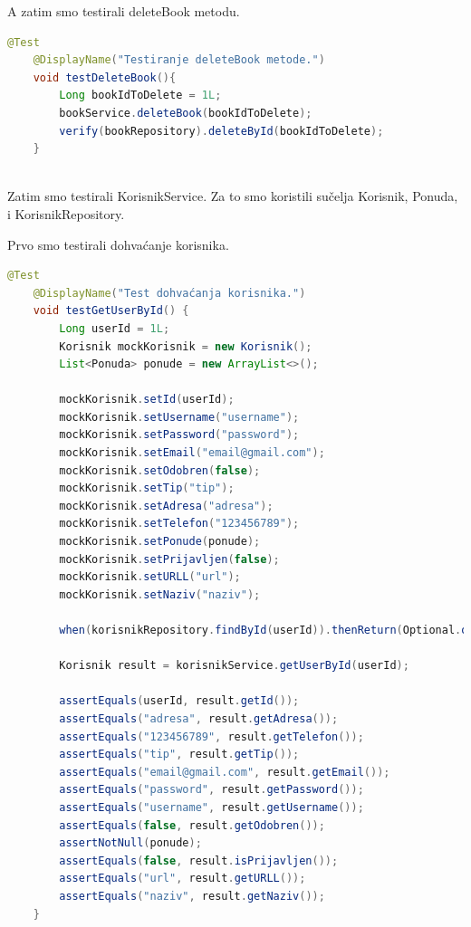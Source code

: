    
			A zatim smo testirali deleteBook metodu. 
                  \begin{lstlisting}[language=Java, label=2st:java_example, basicstyle=\scriptsize, baselinestretch=0.9]
 @Test
    @DisplayName("Testiranje deleteBook metode.")
    void testDeleteBook(){
        Long bookIdToDelete = 1L;
        bookService.deleteBook(bookIdToDelete);
        verify(bookRepository).deleteById(bookIdToDelete);
    }
    
\end{lstlisting}

            Zatim smo testirali KorisnikService. Za to smo koristili sučelja Korisnik, Ponuda, i KorisnikRepository.
            
			Prvo smo testirali dohvaćanje korisnika. 
                  \begin{lstlisting}[language=Java, label=3st:java_example, basicstyle=\scriptsize, baselinestretch=0.9]
 @Test
    @DisplayName("Test dohvaćanja korisnika.")
    void testGetUserById() {
        Long userId = 1L;
        Korisnik mockKorisnik = new Korisnik();
        List<Ponuda> ponude = new ArrayList<>();

        mockKorisnik.setId(userId);
        mockKorisnik.setUsername("username");
        mockKorisnik.setPassword("password");
        mockKorisnik.setEmail("email@gmail.com");
        mockKorisnik.setOdobren(false);
        mockKorisnik.setTip("tip");
        mockKorisnik.setAdresa("adresa");
        mockKorisnik.setTelefon("123456789");
        mockKorisnik.setPonude(ponude);
        mockKorisnik.setPrijavljen(false);
        mockKorisnik.setURLL("url");
        mockKorisnik.setNaziv("naziv");

        when(korisnikRepository.findById(userId)).thenReturn(Optional.of(mockKorisnik));

        Korisnik result = korisnikService.getUserById(userId);

        assertEquals(userId, result.getId());
        assertEquals("adresa", result.getAdresa());
        assertEquals("123456789", result.getTelefon());
        assertEquals("tip", result.getTip());
        assertEquals("email@gmail.com", result.getEmail());
        assertEquals("password", result.getPassword());
        assertEquals("username", result.getUsername());
        assertEquals(false, result.getOdobren());
        assertNotNull(ponude);
        assertEquals(false, result.isPrijavljen());
        assertEquals("url", result.getURLL());
        assertEquals("naziv", result.getNaziv());
    }

    
\end{lstlisting}
            
